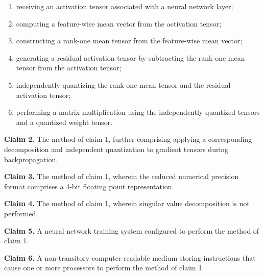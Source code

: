 \documentclass[12pt]{article}
\begin{document}
\begin{enumerate}
    \item receiving an activation tensor associated with a neural network layer;
    \item computing a feature-wise mean vector from the activation tensor;
    \item constructing a rank-one mean tensor from the feature-wise mean vector;
    \item generating a residual activation tensor by subtracting the rank-one mean tensor from the activation tensor;
    \item independently quantizing the rank-one mean tensor and the residual activation tensor;
    \item performing a matrix multiplication using the independently quantized tensors and a quantized weight tensor.
\end{enumerate}

\textbf{Claim 2.} The method of claim 1, further comprising applying a corresponding decomposition and independent quantization to gradient tensors during backpropagation.

\textbf{Claim 3.} The method of claim 1, wherein the reduced numerical precision format comprises a 4-bit floating point representation.

\textbf{Claim 4.} The method of claim 1, wherein singular value decomposition is not performed.

\textbf{Claim 5.} A neural network training system configured to perform the method of claim 1.

\textbf{Claim 6.} A non-transitory computer-readable medium storing instructions that cause one or more processors to perform the method of claim 1.
\end{document}

